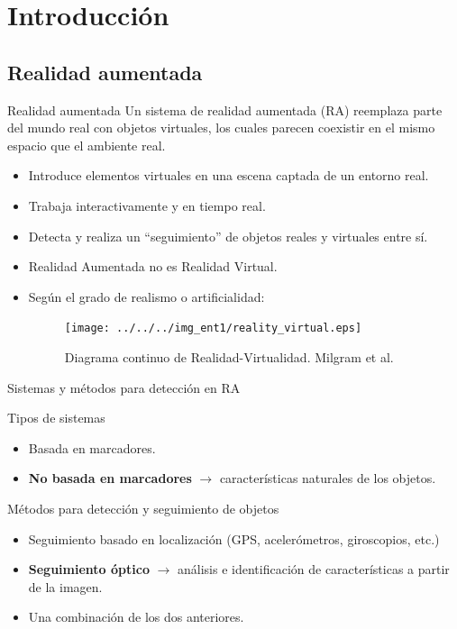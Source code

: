 \section{Introducción}
\subsection*{Realidad aumentada}
\begin{frame}{Realidad aumentada}
\small{Un sistema de realidad aumentada (RA) reemplaza parte del mundo real con objetos virtuales, los cuales parecen coexistir en el mismo espacio que el ambiente real.}
  \begin{itemize}
    \item<1-> Introduce elementos virtuales en una escena captada de un entorno real.
    \item<2-> Trabaja interactivamente y en tiempo real.
    \item<3-> Detecta y realiza un ``seguimiento'' de objetos reales y virtuales entre sí.
    \item<4-> Realidad Aumentada no es Realidad Virtual.
    \item<5-> Según el grado de realismo o artificialidad:
    \begin{figure}[tbhp]
      \begin{centering}
	\texttt{[image: ../../../img\_ent1/reality\_virtual.eps]}
	\caption*{\tiny{Diagrama continuo de Realidad-Virtualidad. Milgram et al.}}
      \end{centering}
    \end{figure}
  \end{itemize}
\end{frame}

\begin{frame}{Sistemas y métodos para detección en RA}
    \begin{block}{Tipos de sistemas}
      \begin{itemize}
	    \item Basada en marcadores. 
	    \item \textbf{No basada en marcadores} $\rightarrow$ características naturales de los objetos.
      \end{itemize}
    \end{block}
   
     \begin{block}{Métodos para detección y seguimiento de objetos}
	\begin{itemize}
		\item Seguimiento basado en localización (GPS, acelerómetros, giroscopios, etc.)
		\item \textbf{Seguimiento óptico} $\rightarrow$ análisis e identificación de características a partir de la imagen.
		\item Una combinación de los dos anteriores.
	\end{itemize}
     \end{block}
\end{frame}


